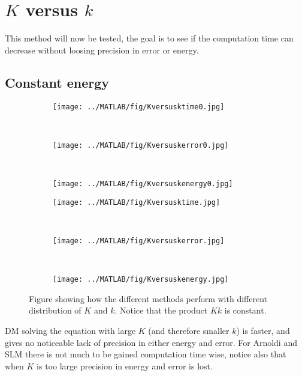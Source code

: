 \section{$K$ versus $k$}%


This method will now be tested, the goal is to see if the computation time can decrease without loosing precision in error or energy.

\subsection{Constant energy}%
\begin{figure}[H]
        \centering
		\begin{subfigure}[b]{0.3\textwidth}
                \texttt{[image: ../MATLAB/fig/Kversusktime0.jpg]}
                \caption{  }
                \label{fig:Kversusktime0}
        \end{subfigure}
        ~
        \begin{subfigure}[b]{0.3\textwidth}
                \texttt{[image: ../MATLAB/fig/Kversuskerror0.jpg]}
                \caption{  }
                \label{fig:Kversuskerror0}
        \end{subfigure}
        ~
        \begin{subfigure}[b]{0.3\textwidth}
                \texttt{[image: ../MATLAB/fig/Kversuskenergy0.jpg]}
                \caption{  }
                \label{fig:Kversuskenergy0}
        \end{subfigure}
        
        \begin{subfigure}[b]{0.3\textwidth}
                \texttt{[image: ../MATLAB/fig/Kversusktime.jpg]}
                \caption{  }
                \label{fig:Kversusktime}
        \end{subfigure}
        ~
        \begin{subfigure}[b]{0.3\textwidth}
                \texttt{[image: ../MATLAB/fig/Kversuskerror.jpg]}
                \caption{  }
                \label{fig:Kversuskerror}
        \end{subfigure}
        ~
        \begin{subfigure}[b]{0.3\textwidth}
                \texttt{[image: ../MATLAB/fig/Kversuskenergy.jpg]}
                \caption{  }
                \label{fig:Kversuskenergy}
        \end{subfigure}
        \caption{Figure showing how the different methods perform with different distribution of $K$ and $k$. Notice that the product $Kk$ is constant. }
        \label{fig:Kversusk}
\end{figure}
DM solving the equation with large $K$ (and therefore smaller $k$) is faster, and gives no noticeable lack of precision in either energy and error. For Arnoldi and SLM there is not much to be gained computation time wise, notice also that when $K$ is too large precision in energy and error is lost.

